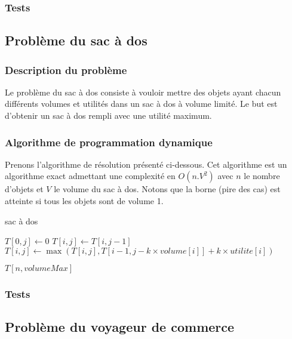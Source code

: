 \subsubsection{Tests}


\subsection{Problème du sac à dos}

\subsubsection{Description du problème}
Le problème du sac à dos consiste à vouloir mettre des objets ayant chacun différents volumes et utilités dans un sac à dos à volume limité. Le but est d'obtenir un sac à dos rempli avec une utilité maximum.

\subsubsection{Algorithme de programmation dynamique}
Prenons l'algorithme de résolution présenté ci-dessous. Cet algorithme est un algorithme exact admettant une complexité en $O(n.V^2)$ avec $n$ le nombre d'objets et $V$ le volume du sac à dos. Notons que la borne (pire des cas) est atteinte si tous les objets sont de volume 1.
\begin{algorithm}[H]
	\caption{sac à dos}
	\begin{algorithmic}[1]
				\STATE $T[0, j] \leftarrow 0$
		\ENDFOR
					\STATE $T[i, j] \leftarrow T[i, j-1]$
				\ENDIF
					\STATE $T[i,j] \leftarrow \max(T[i,j], T[i-1,j-k \times volume[i]] + k \times utilite[i])$
				\ENDFOR
			\ENDFOR
		\ENDFOR
	
	\RETURN $T[n,volumeMax]$
	\end{algorithmic}
\end{algorithm}


\subsubsection{Tests}



\subsection{Problème du voyageur de commerce}

